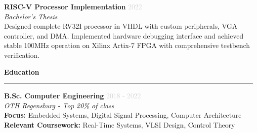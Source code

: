 \documentclass[a4paper,10pt]{article}
\newcommand{\cvsection}[1]{
    \vspace{12pt}
    {\large\bfseries\color{darkgray} #1}
    \vspace{4pt}
    \hrule
    \vspace{8pt}
}
\newcommand{\cventry}[4]{
    \vspace{3pt}
    \textbf{\color{darkgray}#1} \hfill \textcolor{lightgray}{\small #2} \\
    \textcolor{primaryblue}{\textit{\small #3}} \\
    \vspace{3pt}
    {\small #4}
    \vspace{8pt}
}
\newcommand{\cvproject}[3]{
    \vspace{3pt}
    \textbf{\color{darkgray}#1} \hfill \textcolor{lightgray}{\small #2} \\
    \textcolor{primaryblue}{\textit{\small #3}} \\[3pt]
}
\begin{document}
\begin{paracol}{2}
\vspace{8pt}

\cvproject{RISC-V Processor Implementation}{2022}{Bachelor's Thesis}
{\small Designed complete RV32I processor in VHDL with custom peripherals, VGA controller, and DMA. Implemented hardware debugging interface and achieved stable 100MHz operation on Xilinx Artix-7 FPGA with comprehensive testbench verification.}

\cvsection{Education}

\cventry{B.Sc. Computer Engineering}{2018 - 2022}{OTH Regensburg - Top 20\% of class}{
    \textbf{Focus:} Embedded Systems, Digital Signal Processing, Computer Architecture\\
    \textbf{Relevant Coursework:} Real-Time Systems, VLSI Design, Control Theory
}

\vspace{0.5cm}

\end{paracol}
\end{document}

